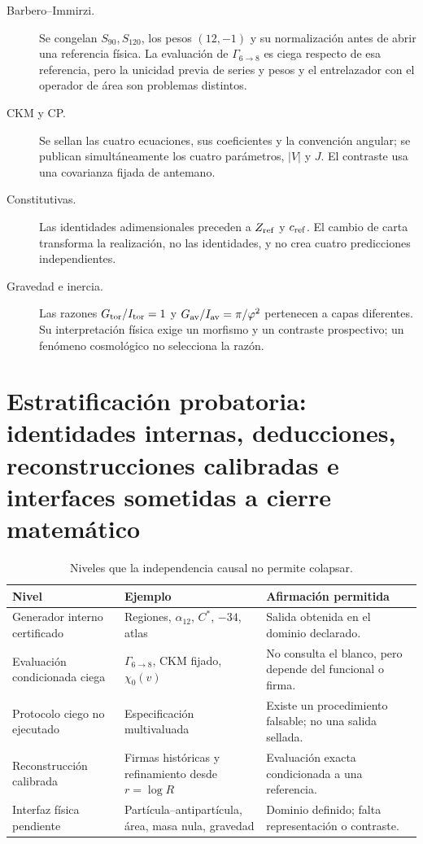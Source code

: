 \begin{description}
 \item[Barbero--Immirzi.] Se congelan \(S_{90},S_{120}\), los pesos
 \((12,-1)\) y su normalización antes de abrir una referencia física. La
 evaluación de \(\Gamma_{6\to8}\) es ciega respecto de esa referencia,
 pero la unicidad previa de series y pesos y el entrelazador con el operador
 de área son problemas distintos.
 \item[CKM y CP.] Se sellan las cuatro ecuaciones, sus coeficientes y la
 convención angular; se publican simultáneamente los cuatro parámetros,
 \(|V|\) y \(J\). El contraste usa una covarianza fijada de antemano.
 \item[Constitutivas.] Las identidades adimensionales preceden a
 \(Z_{\rm ref}\) y \(c_{\rm ref}\). El cambio de carta transforma la
 realización, no las identidades, y no crea cuatro predicciones
 independientes.
 \item[Gravedad e inercia.] Las razones
 \(G_{\rm tor}/I_{\rm tor}=1\) y
 \(G_{\rm av}/I_{\rm av}=\pi/\varphi^2\) pertenecen a capas diferentes.
 Su interpretación física exige un morfismo y un contraste prospectivo; un
 fenómeno cosmológico no selecciona la razón.
\end{description}

\section{Estratificación probatoria: identidades internas, deducciones, reconstrucciones calibradas e interfaces sometidas a cierre matemático}
\label{sec:cinco-niveles-independencia}

\begin{table}[htbp]
\centering
\caption{Niveles que la independencia causal no permite colapsar.}
\label{tab:cinco-niveles-independencia}
\small
\begin{tabularx}{\textwidth}{@{}L{0.25\textwidth}YL{0.27\textwidth}@{}}
\toprule
Nivel & Ejemplo & Afirmación permitida\\
\midrule
Generador interno certificado&
Regiones, \(\alpha_{12}\), \(C^\ast\), \(-34\), atlas&
Salida obtenida en el dominio declarado.\\
Evaluación condicionada ciega&
\(\Gamma_{6\to8}\), CKM fijado, \(\chi_0(v)\)&
No consulta el blanco, pero depende del funcional o firma.\\
Protocolo ciego no ejecutado&
Especificación multivaluada&
Existe un procedimiento falsable; no una salida sellada.\\
Reconstrucción calibrada&
Firmas históricas y refinamiento desde \(r=\log R\)&
Evaluación exacta condicionada a una referencia.\\
Interfaz física pendiente&
Partícula--antipartícula, área, masa nula, gravedad&
Dominio definido; falta representación o contraste.\\
\bottomrule
\end{tabularx}
\end{table}
